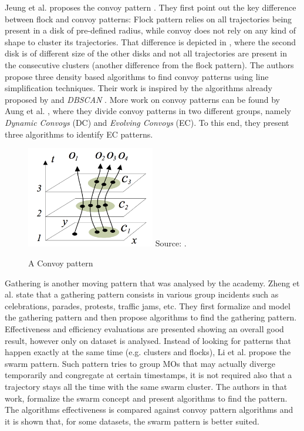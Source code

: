 Jeung et al. proposes the convoy pattern \citep{convoy2}\citep{convoy}. They first point out the key difference between
flock and convoy patterns: Flock pattern relies on all trajectories being present in a disk of pre-defined radius, while
convoy does not rely on any kind of shape to cluster its trajectories. That difference is depicted in
, where the second disk is of different size of the other disks and not all trajectories are
present in the consecutive clusters (another difference from the flock pattern). The authors propose three density based
algorithms to find convoy patterns using line simplification techniques. Their work is inspired by the algorithms
already proposed by \citep{movingclusters} and \textit{DBSCAN} \citep{dbscan}. More work on convoy patterns can be found
by Aung et al. \citep{convoy3}, where they divide convoy patterns in two different groups, namely \textit{Dynamic
Convoys} (DC) and \textit{Evolving Convoys} (EC). To this end, they present three algorithms to identify EC patterns.

\begin{figure}
    \centering
    \caption{A Convoy pattern}
    \includegraphics[width=0.5\textwidth]{images/convoy.png}
    \footnotesize{Source: \citep{convoy2}.}
    \label{fig:convoy_pattern}
\end{figure}

Gathering is another moving pattern that was analysed by the academy. Zheng et al. \citep{gathering} state that a
gathering pattern consists in various group incidents such as celebrations, parades, protests, traffic jams, etc. They
first formalize and model the gathering pattern and then propose algorithms to find the gathering pattern. Effectiveness
and efficiency evaluations are presented showing an overall good result, however only on dataset is analysed. Instead of
looking for patterns that happen exactly at the same time (e.g. clusters and flocks), Li et al. \citep{swarm} propose
the swarm pattern. Such pattern tries to group MOs that may actually diverge temporarily and congregate at certain
timestamps, it is not required also that a trajectory stays all the time with the same swarm cluster. The authors in
that work, formalize the swarm concept and present algorithms to find the pattern. The algorithms effectiveness is
compared against convoy pattern algorithms and it is shown that, for some datasets, the swarm pattern is better suited.

